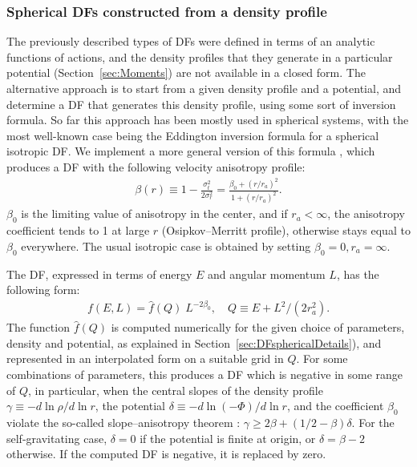 \documentclass[12pt]{article}
\begin{document}
%

\subsubsection{Spherical DFs constructed from a density profile}  \label{sec:DFspherical}

The previously described types of DFs were defined in terms of an analytic functions of actions, and the density profiles that they generate in a particular potential (Section~\ref{sec:Moments}) are not available in a closed form. The alternative approach is to start from a given density profile and a potential, and determine a DF that generates this density profile, using some sort of inversion formula. So far this approach has been mostly used in spherical systems, with the most well-known case being the Eddington inversion formula for a spherical isotropic DF. We implement a more general version of this formula \cite{Cuddeford1991}, which produces a DF with the following velocity anisotropy profile:
\begin{align*}
\beta(r) \equiv 1 - \frac{\sigma_t^2}{2\sigma_r^2} = \frac{\beta_0 + (r/r_a)^2}{1 + (r/r_a)^2}.
\end{align*}
$\beta_0$ is the limiting value of anisotropy in the center, and if $r_a<\infty$, the anisotropy coefficient tends to 1 at large $r$ (Osipkov--Merritt profile), otherwise stays equal to $\beta_0$ everywhere. The usual isotropic case is obtained by setting $\beta_0=0, r_a=\infty$.

The DF, expressed in terms of energy $E$ and angular momentum $L$, has the following form:
\begin{align*}
f(E,L) = \hat f(Q) \; L^{-2\beta_0}, \quad Q\equiv E + L^2 / (2 r_a^2) .
\end{align*}
The function $\hat f(Q)$ is computed numerically for the given choice of parameters, density and potential, as explained in Section~\ref{sec:DFsphericalDetails}), and represented in an interpolated form on a suitable grid in $Q$.
For some combinations of parameters, this produces a DF which is negative in some range of $Q$, in particular, when the central slopes of the density profile $\gamma \equiv -d\ln\rho/d\ln r$, the potential $\delta \equiv -d\ln(-\Phi)/d\ln r$, and the coefficient $\beta_0$ violate the so-called slope--anisotropy theorem \cite{AnEvans2006}: $\gamma \ge 2\beta + (1/2-\beta)\delta$. For the self-gravitating case, $\delta=0$ if the potential is finite at origin, or $\delta=\beta-2$ otherwise. If the computed DF is negative, it is replaced by zero.
\end{document}
